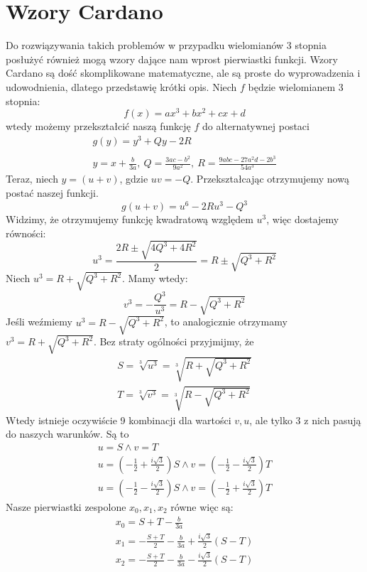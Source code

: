 \documentclass[a4paper]{article}
\begin{document}
\section{Wzory Cardano}
    Do rozwiązywania takich problemów w przypadku wielomianów 3 stopnia posłużyć również mogą wzory dające nam wprost
    pierwiastki funkcji. Wzory Cardano są dość skomplikowane matematyczne, ale są proste do wyprowadzenia i udowodnienia,
    dlatego przedstawię krótki opis. Niech $f$ będzie wielomianem 3 stopnia:
    \[
        f(x) = ax^3 + bx^2 + cx + d
    \]
    wtedy możemy przekształcić naszą funkcję $f$ do alternatywnej postaci
    \[
        \begin{array}{c}
            g(y) = y^3 + Qy - 2R \\ \\
            y = x + \frac{b}{3a }, \ Q = \frac{3ac - b^2}{9a^2}, \ R = \frac{9abc - 27a^2d - 2b^3}{54a^3} 
        \end{array}
    \]
    Teraz, niech $y = (u + v)$, gdzie $uv = -Q$. Przekształcając otrzymujemy nową postać naszej funkcji.
    \[
        g(u + v) = u^6 - 2Ru^3 - Q^3
    \]
    Widzimy, że otrzymujemy funkcję kwadratową względem $u^3$, więc dostajemy równości:
    \[
        u^3 = \frac{2R \pm \sqrt{4Q^3 + 4R^2}}{2} = R \pm \sqrt{Q^3 + R^2}
    \]
    Niech $u^3 = R + \sqrt{Q^3 + R^2}$. Mamy wtedy:
    \[
        v^3 = -\frac{Q^3}{u^3} = R - \sqrt{Q^3 + R^2}
    \]
    Jeśli weźmiemy $u^3 = R - \sqrt{Q^3 + R^2}$, to analogicznie otrzymamy $v^3 = R + \sqrt{Q^3 + R^2}$. 
    Bez straty ogólności przyjmijmy, że
    \[
        \begin{array}{c}
            S = \sqrt[3]{u^3} = \sqrt[3]{R + \sqrt{Q^3 + R^2}} \\
            T = \sqrt[3]{v^3} = \sqrt[3]{R - \sqrt{Q^3 + R^2}}
        \end{array}
    \]
    Wtedy istnieje oczywiście 9 kombinacji dla wartości $v, u$, ale tylko 3 z nich pasują do naszych
    warunków. Są to 
    \[
        \begin{array}{c}
            u = S \land v = T \\
            u = (-\frac{1}{2} + \frac{i\sqrt{3}}{2})S \land v = (-\frac{1}{2} - \frac{i\sqrt{3}}{2})T \\
            u = (-\frac{1}{2} - \frac{i\sqrt{3}}{2})S \land v = (-\frac{1}{2} + \frac{i\sqrt{3}}{2})T
        \end{array}
    \]
    Nasze pierwiastki zespolone $x_0, x_1, x_2$ równe więc są:
    \[
        \begin{array}{c}
            x_0 = S + T - \frac{b}{3a} \\
            x_1 = -\frac{S + T}{2} - \frac{b}{3a} + \frac{i\sqrt{3}}{2}(S - T) \\
            x_2 = -\frac{S + T}{2} - \frac{b}{3a} - \frac{i\sqrt{3}}{2}(S - T)
        \end{array}
    \]
\end{document}
